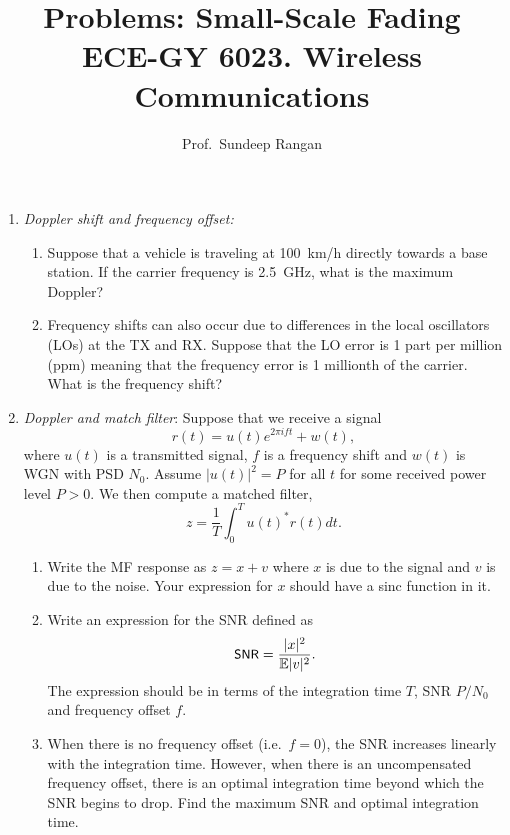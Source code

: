 \documentclass[11pt]{article}
\def\SNR{\mbox{\small \sffamily SNR}}
\def\Exp{\mathbb{E}}
\begin{document}
\title{Problems:  Small-Scale Fading\\
ECE-GY 6023. Wireless Communications}
\author{Prof.\ Sundeep Rangan}
\date{}

\maketitle


\begin{enumerate}

\item \emph{Doppler shift and frequency offset:}
\begin{enumerate}[label=(\alph*)]
\item Suppose that a vehicle is traveling at \SI{100}{km/h} directly towards a base station.
If the carrier frequency is \SI{2.5}{GHz}, what is the maximum Doppler?

\item Frequency shifts can also occur due to differences in the local oscillators
(LOs) at the TX and RX.  Suppose that the LO error is 1 part per million (ppm)
meaning that the frequency error is 1 millionth of the carrier.  What is the
frequency shift?
\end{enumerate}


\item \emph{Doppler and match filter}:  Suppose that we receive a signal
\[
    r(t) = u(t)e^{2\pi i ft} + w(t),
\]
where $u(t)$ is a transmitted signal, $f$ is a frequency shift
and $w(t)$ is WGN with PSD $N_0$.  Assume $|u(t)|^2=P$ for all $t$
for some received power level $P > 0$.
We then compute a matched filter,
\[
    z = \frac{1}{T} \int_0^T u(t)^*r(t)dt.
\]
\begin{enumerate}[label=(\alph*)]
\item Write the MF response as $z = x + v$ where $x$ is due to the signal
and $v$ is due to the noise.  Your expression for $x$ should have a sinc
function in it.

\item Write an expression for the SNR defined as
\[
    \SNR = \frac{|x|^2}{\Exp|v|^2}.
\]
The expression should be in terms of the integration time $T$,
SNR $P/N_0$ and frequency offset $f$.

\item When there is no frequency offset (i.e.\ $f=0$), the SNR increases
linearly with the integration time.  However, when there is an uncompensated
frequency offset, there is an optimal integration time beyond which
the SNR begins to drop.  Find the maximum SNR and optimal integration time.


\end{enumerate}
\end{enumerate}
\end{document}
